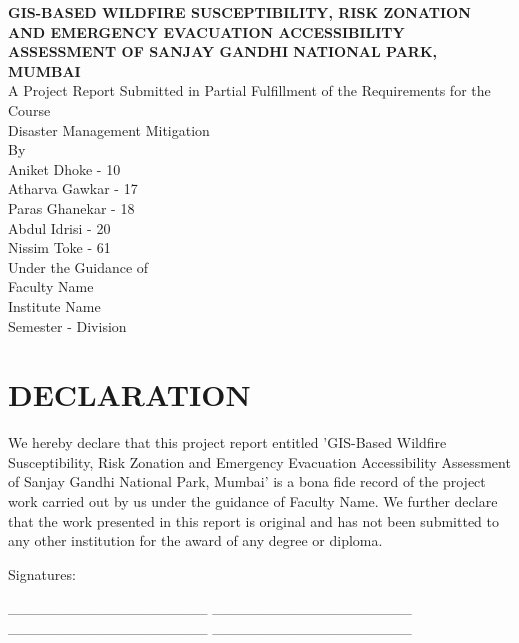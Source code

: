 \documentclass[12pt,a4paper]{article}
\begin{document}
\begin{titlepage}
\begin{center}
\vspace*{1cm}
\Large\textbf{GIS-BASED WILDFIRE SUSCEPTIBILITY, RISK ZONATION AND EMERGENCY EVACUATION ACCESSIBILITY ASSESSMENT OF SANJAY GANDHI NATIONAL PARK, MUMBAI}\\[1.5cm]

A Project Report Submitted in Partial Fulfillment of the Requirements for the Course\\
Disaster Management Mitigation\\[1.5cm]

By\\
Aniket Dhoke - 10\\
Atharva Gawkar - 17\\
Paras Ghanekar - 18\\
Abdul Idrisi - 20\\
Nissim Toke - 61\\[1.5cm]

Under the Guidance of\\
Faculty Name\\[1.5cm]

Institute Name\\[0.5cm]
Semester - Division
\end{center}
\end{titlepage}




\clearpage
\section*{DECLARATION}

We hereby declare that this project report entitled 'GIS-Based Wildfire Susceptibility, Risk Zonation and Emergency Evacuation Accessibility Assessment of Sanjay Gandhi National Park, Mumbai' is a bona fide record of the project work carried out by us under the guidance of Faculty Name. We further declare that the work presented in this report is original and has not been submitted to any other institution for the award of any degree or diploma.




Signatures:

\_\_\_\_\_\_\_\_\_\_\_\_\_\_\_\_\_\_\_
\_\_\_\_\_\_\_\_\_\_\_\_\_\_\_\_\_\_\_
\_\_\_\_\_\_\_\_\_\_\_\_\_\_\_\_\_\_\_
\_\_\_\_\_\_\_\_\_\_\_\_\_\_\_\_\_\_\_
\end{document}
